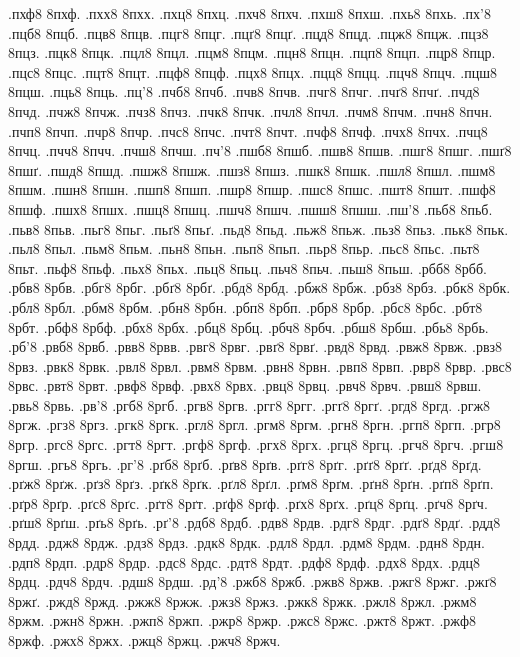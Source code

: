 {.пхф8 8пхф.
.пхх8 8пхх.
.пхц8 8пхц.
.пхч8 8пхч.
.пхш8 8пхш.
.пхь8 8пхь.
.пх'8
.пцб8 8пцб.
.пцв8 8пцв.
.пцг8 8пцг.
.пцґ8 8пцґ.
.пцд8 8пцд.
.пцж8 8пцж.
.пцз8 8пцз.
.пцк8 8пцк.
.пцл8 8пцл.
.пцм8 8пцм.
.пцн8 8пцн.
.пцп8 8пцп.
.пцр8 8пцр.
.пцс8 8пцс.
.пцт8 8пцт.
.пцф8 8пцф.
.пцх8 8пцх.
.пцц8 8пцц.
.пцч8 8пцч.
.пцш8 8пцш.
.пць8 8пць.
.пц'8
.пчб8 8пчб.
.пчв8 8пчв.
.пчг8 8пчг.
.пчґ8 8пчґ.
.пчд8 8пчд.
.пчж8 8пчж.
.пчз8 8пчз.
.пчк8 8пчк.
.пчл8 8пчл.
.пчм8 8пчм.
.пчн8 8пчн.
.пчп8 8пчп.
.пчр8 8пчр.
.пчс8 8пчс.
.пчт8 8пчт.
.пчф8 8пчф.
.пчх8 8пчх.
.пчц8 8пчц.
.пчч8 8пчч.
.пчш8 8пчш.
.пч'8
.пшб8 8пшб.
.пшв8 8пшв.
.пшг8 8пшг.
.пшґ8 8пшґ.
.пшд8 8пшд.
.пшж8 8пшж.
.пшз8 8пшз.
.пшк8 8пшк.
.пшл8 8пшл.
.пшм8 8пшм.
.пшн8 8пшн.
.пшп8 8пшп.
.пшр8 8пшр.
.пшс8 8пшс.
.пшт8 8пшт.
.пшф8 8пшф.
.пшх8 8пшх.
.пшц8 8пшц.
.пшч8 8пшч.
.пшш8 8пшш.
.пш'8
.пьб8 8пьб.
.пьв8 8пьв.
.пьг8 8пьг.
.пьґ8 8пьґ.
.пьд8 8пьд.
.пьж8 8пьж.
.пьз8 8пьз.
.пьк8 8пьк.
.пьл8 8пьл.
.пьм8 8пьм.
.пьн8 8пьн.
.пьп8 8пьп.
.пьр8 8пьр.
.пьс8 8пьс.
.пьт8 8пьт.
.пьф8 8пьф.
.пьх8 8пьх.
.пьц8 8пьц.
.пьч8 8пьч.
.пьш8 8пьш.
.рбб8 8рбб.
.рбв8 8рбв.
.рбг8 8рбг.
.рбґ8 8рбґ.
.рбд8 8рбд.
.рбж8 8рбж.
.рбз8 8рбз.
.рбк8 8рбк.
.рбл8 8рбл.
.рбм8 8рбм.
.рбн8 8рбн.
.рбп8 8рбп.
.рбр8 8рбр.
.рбс8 8рбс.
.рбт8 8рбт.
.рбф8 8рбф.
.рбх8 8рбх.
.рбц8 8рбц.
.рбч8 8рбч.
.рбш8 8рбш.
.рбь8 8рбь.
.рб'8
.рвб8 8рвб.
.рвв8 8рвв.
.рвг8 8рвг.
.рвґ8 8рвґ.
.рвд8 8рвд.
.рвж8 8рвж.
.рвз8 8рвз.
.рвк8 8рвк.
.рвл8 8рвл.
.рвм8 8рвм.
.рвн8 8рвн.
.рвп8 8рвп.
.рвр8 8рвр.
.рвс8 8рвс.
.рвт8 8рвт.
.рвф8 8рвф.
.рвх8 8рвх.
.рвц8 8рвц.
.рвч8 8рвч.
.рвш8 8рвш.
.рвь8 8рвь.
.рв'8
.ргб8 8ргб.
.ргв8 8ргв.
.ргг8 8ргг.
.ргґ8 8ргґ.
.ргд8 8ргд.
.ргж8 8ргж.
.ргз8 8ргз.
.ргк8 8ргк.
.ргл8 8ргл.
.ргм8 8ргм.
.ргн8 8ргн.
.ргп8 8ргп.
.ргр8 8ргр.
.ргс8 8ргс.
.ргт8 8ргт.
.ргф8 8ргф.
.ргх8 8ргх.
.ргц8 8ргц.
.ргч8 8ргч.
.ргш8 8ргш.
.ргь8 8ргь.
.рг'8
.рґб8 8рґб.
.рґв8 8рґв.
.рґг8 8рґг.
.рґґ8 8рґґ.
.рґд8 8рґд.
.рґж8 8рґж.
.рґз8 8рґз.
.рґк8 8рґк.
.рґл8 8рґл.
.рґм8 8рґм.
.рґн8 8рґн.
.рґп8 8рґп.
.рґр8 8рґр.
.рґс8 8рґс.
.рґт8 8рґт.
.рґф8 8рґф.
.рґх8 8рґх.
.рґц8 8рґц.
.рґч8 8рґч.
.рґш8 8рґш.
.рґь8 8рґь.
.рґ'8
.рдб8 8рдб.
.рдв8 8рдв.
.рдг8 8рдг.
.рдґ8 8рдґ.
.рдд8 8рдд.
.рдж8 8рдж.
.рдз8 8рдз.
.рдк8 8рдк.
.рдл8 8рдл.
.рдм8 8рдм.
.рдн8 8рдн.
.рдп8 8рдп.
.рдр8 8рдр.
.рдс8 8рдс.
.рдт8 8рдт.
.рдф8 8рдф.
.рдх8 8рдх.
.рдц8 8рдц.
.рдч8 8рдч.
.рдш8 8рдш.
.рд'8
.ржб8 8ржб.
.ржв8 8ржв.
.ржг8 8ржг.
.ржґ8 8ржґ.
.ржд8 8ржд.
.ржж8 8ржж.
.ржз8 8ржз.
.ржк8 8ржк.
.ржл8 8ржл.
.ржм8 8ржм.
.ржн8 8ржн.
.ржп8 8ржп.
.ржр8 8ржр.
.ржс8 8ржс.
.ржт8 8ржт.
.ржф8 8ржф.
.ржх8 8ржх.
.ржц8 8ржц.
.ржч8 8ржч.
}
